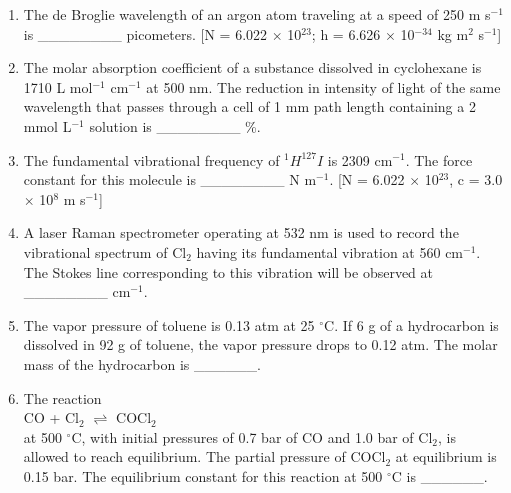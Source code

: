 \documentclass[journal,12pt,onecolumn]{IEEEtran}
\begin{document}
\begin{enumerate}
    \item The de Broglie wavelength of an argon atom  traveling at a speed of 250 m s$^{-1}$  is \_\_\_\_\_\_\_\_ picometers. [N = 6.022 $\times$ 10$^{23}$; h = 6.626 $\times$ 10$^{-34}$ kg m$^2$ s$^{-1}$]
    \hfill{}
    
    \item The molar absorption coefficient of a substance dissolved in cyclohexane is 1710 L mol$^{-1}$ cm$^{-1}$ at 500 nm. The reduction in intensity of light of the same wavelength that passes through a cell of 1 mm path length containing a 2 mmol L$^{-1}$ solution  is \_\_\_\_\_\_\_\_ \%.
    \hfill{}

    \item The fundamental vibrational frequency of $^1H^{127}I$ is 2309 cm$^{-1}$. The force constant for this molecule  is \_\_\_\_\_\_\_\_ N m$^{-1}$. [N = 6.022 $\times$ 10$^{23}$, c = 3.0 $\times$ 10$^8$ m s$^{-1}$]
    \hfill{}

    \item A laser Raman spectrometer operating at 532 nm is used to record the vibrational spectrum of Cl$_2$ having its fundamental vibration at 560 cm$^{-1}$. The Stokes line corresponding to this vibration will be observed at \_\_\_\_\_\_\_\_ cm$^{-1}$. 
    \hfill{}
\item The vapor pressure of toluene  is 0.13 atm at 25 $^\circ$C. 
If 6 g of a hydrocarbon is dissolved in 92 g of toluene, the vapor pressure drops to 0.12 atm. 
The molar mass of the hydrocarbon  is \_\_\_\_\_\_.
\hfill{}


\item The reaction \\
CO  + Cl$_2$  $\rightleftharpoons$ COCl$_2$  \\
at 500 $^\circ$C, with initial pressures of 0.7 bar of CO and 1.0 bar of Cl$_2$, is allowed to reach equilibrium. 
The partial pressure of COCl$_2$  at equilibrium is 0.15 bar. 
The equilibrium constant for this reaction at 500 $^\circ$C  is \_\_\_\_\_\_.
\hfill{}


\end{enumerate}
\end{document}
